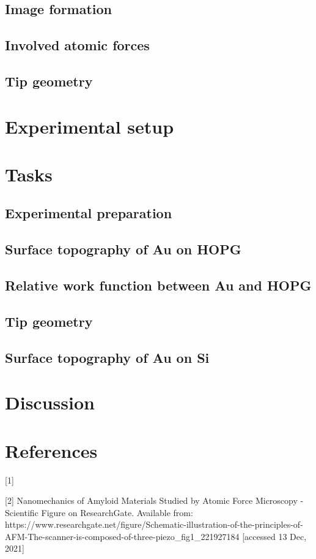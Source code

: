 \documentclass{article}
\begin{document}
\subsection{Image formation}

\subsection{Involved atomic forces}

\subsection{Tip geometry}

\section{Experimental setup}

\section{Tasks}

\subsection{Experimental preparation}

\subsection{Surface topography of Au on HOPG}

\subsection{Relative work function between Au and HOPG}

\subsection{Tip geometry}

\subsection{Surface topography of Au on Si}

\section{Discussion}


\section*{References}

[1] 

[2] Nanomechanics of Amyloid Materials Studied by Atomic Force Microscopy - Scientific Figure on ResearchGate. Available from: https://www.researchgate.net/figure/Schematic-illustration-of-the-principles-of-AFM-The-scanner-is-composed-of-three-piezo_fig1_221927184 [accessed 13 Dec, 2021]
\end{document}
